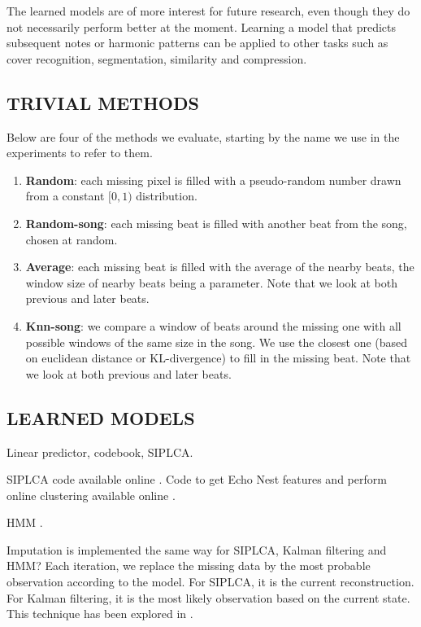 \documentclass{article}
\begin{document}
The learned models are of more interest for future research, even though they do not
necessarily perform better at the moment. Learning a model that predicts subsequent
notes or harmonic patterns can be applied to other tasks such as cover recognition,
segmentation, similarity and compression.

\subsection{TRIVIAL METHODS}
\label{ssec:trivialmethods}
Below are four of the methods we evaluate, starting by the name we use in the experiments
to refer to them.
\begin{enumerate}
\item \textbf{Random}: each missing pixel is filled with a pseudo-random number drawn from
a constant $[0,1)$ distribution.
\item \textbf{Random-song}: each missing beat is filled with another beat from the song,
chosen at random.
\item \textbf{Average}: each missing beat is filled with the average of the nearby beats,
the window size of nearby beats being a parameter. Note that we look at both previous and
later beats.
\item \textbf{Knn-song}: we compare a window of beats around the missing one with
all possible windows of the same size in the song. We use the closest one (based on euclidean
distance or KL-divergence) to fill in the missing beat. Note that we look at both
previous and later beats.
\end{enumerate}

\subsection{LEARNED MODELS}
\label{ssec:learnedmodels}

Linear predictor, codebook, SIPLCA.

SIPLCA code available online \cite{Weiss2010}. Code to get Echo Nest features and perform
online clustering available online \cite{Bertin-Mahieux2010a}.

HMM \cite{Rabiner1989}.

Imputation is implemented the same way for SIPLCA, Kalman filtering and HMM? Each iteration,
we replace the missing data by the most probable observation according to the model.
For SIPLCA, it is the current reconstruction. For Kalman filtering, it is the most likely
observation based on the current state. This technique has been explored in \cite{Zhang2006}.
\end{document}
